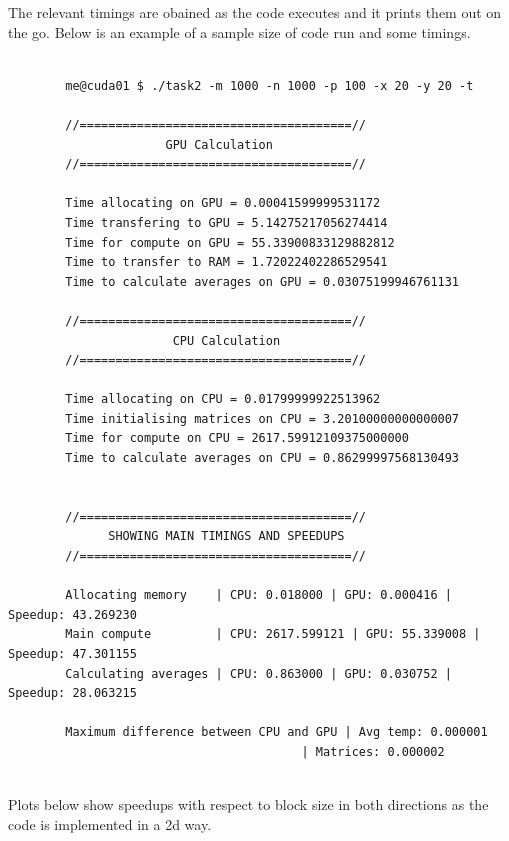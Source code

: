 \documentclass[a4paper]{article}
\begin{document}
	The relevant timings are obained as the code executes and it prints them out
	on the go. Below is an example of a sample size of code run and some timings.

	\begin{verbatim}

		me@cuda01 $ ./task2 -m 1000 -n 1000 -p 100 -x 20 -y 20 -t

		//======================================//
					  GPU Calculation
		//======================================//

		Time allocating on GPU = 0.00041599999531172
		Time transfering to GPU = 5.14275217056274414
		Time for compute on GPU = 55.33900833129882812
		Time to transfer to RAM = 1.72022402286529541
		Time to calculate averages on GPU = 0.03075199946761131

		//======================================//
					   CPU Calculation
		//======================================//

		Time allocating on CPU = 0.01799999922513962
		Time initialising matrices on CPU = 3.20100000000000007
		Time for compute on CPU = 2617.59912109375000000
		Time to calculate averages on CPU = 0.86299997568130493


		//======================================//
			  SHOWING MAIN TIMINGS AND SPEEDUPS
		//======================================//

		Allocating memory    | CPU: 0.018000 | GPU: 0.000416 | Speedup: 43.269230
		Main compute         | CPU: 2617.599121 | GPU: 55.339008 | Speedup: 47.301155
		Calculating averages | CPU: 0.863000 | GPU: 0.030752 | Speedup: 28.063215

		Maximum difference between CPU and GPU | Avg temp: 0.000001
                                         | Matrices: 0.000002
				
	\end{verbatim}

	
	Plots below show speedups with respect to block size in both directions as 
	the code is implemented in a 2d way.
\end{document}

